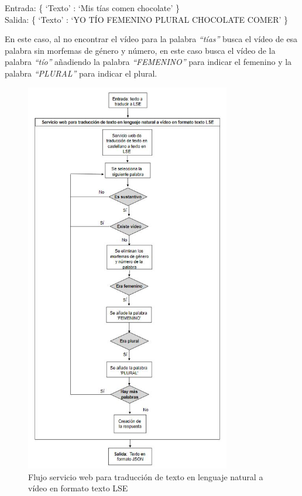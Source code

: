 \begin{center}
	Entrada: \{ `Texto' : `Mis tías comen chocolate' \} \\
	Salida: \{ `Texto' : `YO TÍO FEMENINO PLURAL CHOCOLATE COMER' \}
\end{center}

En este caso, al no encontrar el vídeo para la palabra \textit{``tías''} busca el vídeo de esa palabra sin morfemas de género y número, en este caso busca el vídeo de la palabra \textit{``tío''} añadiendo la palabra  \textit{``FEMENINO''} para indicar el femenino y la palabra  \textit{``PLURAL''} para indicar el plural.


\begin{figure}[]
	\centering
	\includegraphics[width=0.8\textwidth]{Imagenes/Fuentes/Text2LSE/FlujoTextoVideoTexto.jpg}
	\caption{ Flujo servicio web para traducción de texto en lenguaje natural a vídeo en formato texto LSE }
	\label {fig: imgFlujoTextoVideoTextoText2LSE}
\end{figure}

